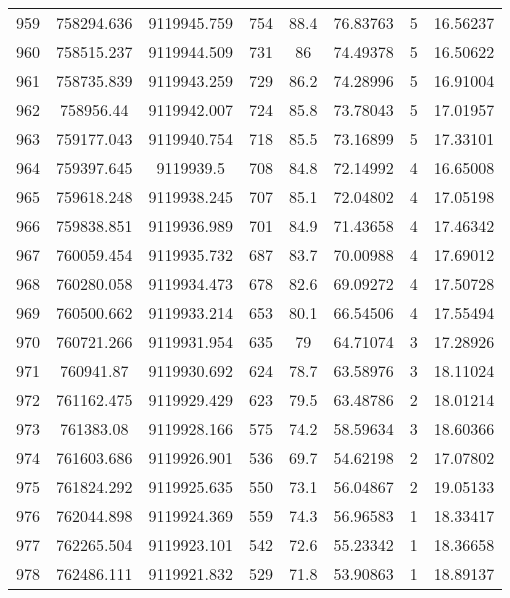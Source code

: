 \begin{longtable}{cccccccc}
959  & 758294.636      & 9119945.759      & 754     & 88.4  & 76.83763 & 5  & 16.56237 \\
960  & 758515.237      & 9119944.509      & 731     & 86    & 74.49378 & 5  & 16.50622 \\
961  & 758735.839      & 9119943.259      & 729     & 86.2  & 74.28996 & 5  & 16.91004 \\
962  & 758956.44       & 9119942.007      & 724     & 85.8  & 73.78043 & 5  & 17.01957 \\
963  & 759177.043      & 9119940.754      & 718     & 85.5  & 73.16899 & 5  & 17.33101 \\
964  & 759397.645      & 9119939.5        & 708     & 84.8  & 72.14992 & 4  & 16.65008 \\
965  & 759618.248      & 9119938.245      & 707     & 85.1  & 72.04802 & 4  & 17.05198 \\
966  & 759838.851      & 9119936.989      & 701     & 84.9  & 71.43658 & 4  & 17.46342 \\
967  & 760059.454      & 9119935.732      & 687     & 83.7  & 70.00988 & 4  & 17.69012 \\
968  & 760280.058      & 9119934.473      & 678     & 82.6  & 69.09272 & 4  & 17.50728 \\
969  & 760500.662      & 9119933.214      & 653     & 80.1  & 66.54506 & 4  & 17.55494 \\
970  & 760721.266      & 9119931.954      & 635     & 79    & 64.71074 & 3  & 17.28926 \\
971  & 760941.87       & 9119930.692      & 624     & 78.7  & 63.58976 & 3  & 18.11024 \\
972  & 761162.475      & 9119929.429      & 623     & 79.5  & 63.48786 & 2  & 18.01214 \\
973  & 761383.08       & 9119928.166      & 575     & 74.2  & 58.59634 & 3  & 18.60366 \\
974  & 761603.686      & 9119926.901      & 536     & 69.7  & 54.62198 & 2  & 17.07802 \\
975  & 761824.292      & 9119925.635      & 550     & 73.1  & 56.04867 & 2  & 19.05133 \\
976  & 762044.898      & 9119924.369      & 559     & 74.3  & 56.96583 & 1  & 18.33417 \\
977  & 762265.504      & 9119923.101      & 542     & 72.6  & 55.23342 & 1  & 18.36658 \\
978  & 762486.111      & 9119921.832      & 529     & 71.8  & 53.90863 & 1  & 18.89137 \\

\end{longtable}
